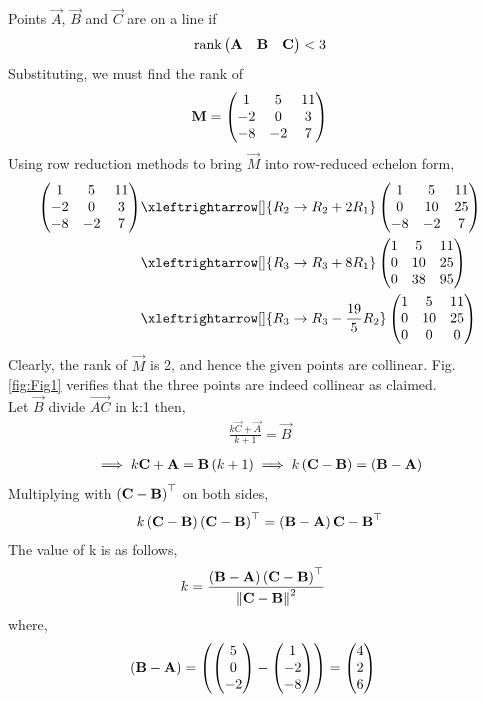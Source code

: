 \begin{enumerate}[label=\thesection.\arabic*.,ref=\thesection.\theenumi]
		Points $\vec{A}$, $\vec{B}$ and $\vec{C}$ are on a line if
    \begin{align}
        \textrm{rank}\begin{pmatrix}\mathbf{A} & \mathbf{B} & \mathbf{C}\end{pmatrix} < 3
        \label{eq:chapters/12/10/5/8rank-collinear}
    \end{align}
    Substituting, we must find the rank of
    \begin{align}
        \mathbf{M} = \begin{pmatrix}1&5&11\\-2&0&3\\-8&-2&7\end{pmatrix}
    \end{align}
    Using row reduction methods to bring $\vec{M}$ into row-reduced echelon form,
    \begin{align}
        \myvec{1&5&11\\-2&0&3\\-8&-2&7}&\xleftrightarrow[]{R_2\rightarrow R_2+2R_1}
        \myvec{1&5&11\\0&10&25\\-8&-2&7} \\
                &\xleftrightarrow[]{R_3\rightarrow R_3+8R_1}\myvec{1&5&11\\0&10&25\\0&38&95} \\
                &\xleftrightarrow[]{R_3\rightarrow R_3-\frac{19}{5}R_2}\myvec{1&5&11\\0&10&25\\0&0&0}
                \label{eq:chapters/12/10/5/8row-red}
    \end{align}
    Clearly, the rank of $\vec{M}$ is 2, and hence the given points are 
    collinear. 
    Fig. \ref{fig:Fig1}  verifies that the three points are indeed 
    collinear as claimed.\\
	Let $\vec{B}$ divide $\vec{AC}$ in k:1 then,
	\begin{align}
		\frac{k\vec{C}+\vec{A}}{k+1} = \vec{B}
	\end{align}
		\begin{align}
			\implies k\mathbf{C}+\mathbf{A}=\mathbf{B}\left(k+1\right)
			\implies k\left(\mathbf{C}-\mathbf{B}\right)=\left(\mathbf{B}-\mathbf{A}\right)
		\end{align}
			Multiplying with $\left(\mathbf{C}-\mathbf{B}\right)^{\top}$ on both sides,\\
	
		\begin{align*}
			 k\left(\mathbf{C}-\mathbf{B}\right)\left(\mathbf{C}-\mathbf{B}\right)^{\top}=\left(\mathbf{B}-\mathbf{A}\right){\mathbf{C}-\mathbf{B}}^{\top}
		\end{align*}
			The value of k is as follows,
			\begin{align}
			k &=
			\frac{\left(\mathbf{B}-\mathbf{A}\right)\left(\mathbf{C}-\mathbf{B}\right)^{\top}}{\left\lVert\mathbf{C-B}\right\rVert^2}
			\end{align}
			where,
			\begin{align}
				\left(\mathbf{B-A}\right) &=
				\left(\begin{pmatrix}5\\0\\-2\end{pmatrix}-\begin{pmatrix}1\\-2\\-8\end{pmatrix}\right) =
				\begin{pmatrix}4\\2\\6\end{pmatrix}
			\end{align}
			

\end{enumerate}

